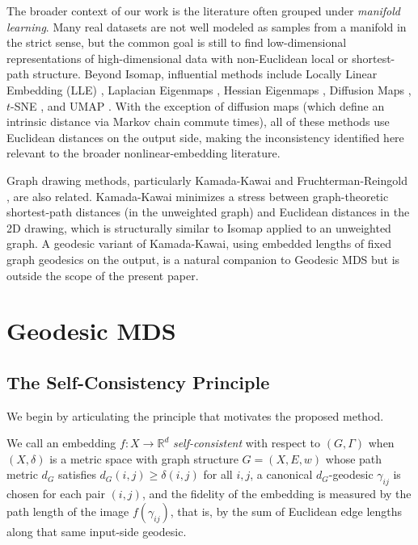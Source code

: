 \documentclass[11pt]{article}
\newcommand{\R}{\mathbb{R}}
\begin{document}
The broader context of our work is the literature often grouped under
\emph{manifold learning}.  Many real datasets are not well modeled as
samples from a manifold in the strict sense, but the common goal is still
to find low-dimensional representations of high-dimensional data with
non-Euclidean local or shortest-path structure.  Beyond Isomap, influential methods
include Locally Linear Embedding (LLE) \citep{roweis2000nonlinear},
Laplacian Eigenmaps \citep{belkin2003laplacian}, Hessian Eigenmaps
\citep{donoho2003hessian}, Diffusion Maps \citep{coifman2006diffusion},
$t$-SNE \citep{vandermaaten2008tsne}, and UMAP \citep{mcinnes2018umap}.
With the exception of diffusion maps (which define an intrinsic distance via
Markov chain commute times), all of these methods use Euclidean distances
on the output side, making the inconsistency identified here relevant to the
broader nonlinear-embedding literature.

Graph drawing methods, particularly Kamada-Kawai \citep{kamada1989algorithm}
and Fruchterman-Reingold \citep{fruchterman1991graph}, are also related.
Kamada-Kawai minimizes a stress between graph-theoretic shortest-path
distances (in the unweighted graph) and Euclidean distances in the 2D
drawing, which is structurally similar to Isomap applied to an unweighted
graph.  A geodesic variant of Kamada-Kawai, using embedded lengths of
fixed graph geodesics on the output, is a natural companion to Geodesic
MDS but is outside the scope of the present paper.

\section{Geodesic MDS}
\label{sec:geodesic_mds}

\subsection{The Self-Consistency Principle}
\label{sec:self_consistency}

We begin by articulating the principle that motivates the proposed method.

We call an embedding $f: X \to \R^d$ \emph{self-consistent} with respect
to $(G, \Gamma)$ when $(X,\delta)$ is a metric space with graph
structure $G = (X, E, w)$ whose path metric $d_G$ satisfies
$d_G(i,j) \geq \delta(i,j)$ for all $i,j$, a canonical $d_G$-geodesic
$\gamma_{ij}$ is chosen for each pair $(i,j)$, and the fidelity of the
embedding is measured by the path length of the image $f(\gamma_{ij})$,
that is, by the sum of Euclidean edge lengths along that same input-side
geodesic.
\end{document}
